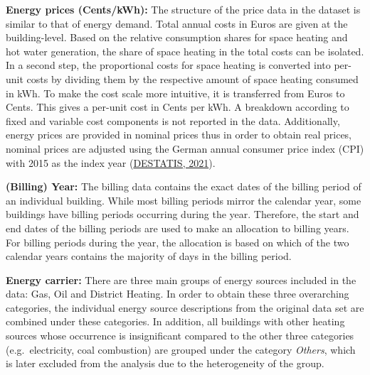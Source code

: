 \documentclass[12pt,twoside]{reedthesis}
\begin{document}
\textbf{Energy prices (Cents/kWh):} The structure of the price data in the dataset is similar to that of energy demand. Total annual costs in Euros are given at the building-level. Based on the relative consumption shares for space heating and hot water generation, the share of space heating in the total costs can be isolated. In a second step, the proportional costs for space heating is converted into per-unit costs by dividing them by the respective amount of space heating consumed in kWh. To make the cost scale more intuitive, it is transferred from Euros to Cents. This gives a per-unit cost in Cents per kWh. A breakdown according to fixed and variable cost components is not reported in the data. Additionally, energy prices are provided in nominal prices thus in order to obtain real prices, nominal prices are adjusted using the German annual consumer price index (CPI) with 2015 as the index year (\protect\hyperlink{ref-destatis21}{DESTATIS, 2021}).

\textbf{(Billing) Year:} The billing data contains the exact dates of the billing period of an individual building. While most billing periods mirror the calendar year, some buildings have billing periods occurring during the year. Therefore, the start and end dates of the billing periods are used to make an allocation to billing years. For billing periods during the year, the allocation is based on which of the two calendar years contains the majority of days in the billing period.

\textbf{Energy carrier:} There are three main groups of energy sources included in the data: Gas, Oil and District Heating. In order to obtain these three overarching categories, the individual energy source descriptions from the original data set are combined under these categories. In addition, all buildings with other heating sources whose occurrence is insignificant compared to the other three categories (e.g.~electricity, coal combustion) are grouped under the category \emph{Others}, which is later excluded from the analysis due to the heterogeneity of the group.
\end{document}
